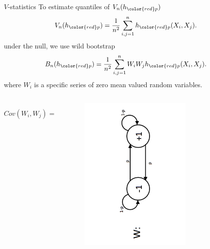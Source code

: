 \documentclass{beamer}
\begin{document}
 
  \begin{frame}{$V$-statistics}
To estimate quantiles of $ V_n(h_{\color{red} p})$  
\[
 V_n(h_{\color{red} p}) = \frac {1} {n^2} \sum_{i,j=1}^n h_{\color{red} p}(X_i,X_j).
\]
under the null, we use wild bootstrap
\[
 B_n(h_{\color{red} p}) = \frac {1} {n^2} \sum_{i,j=1}^n W_i W_j h_{\color{red} p}(X_i,X_j).
\]
  where $W_i$ is a specific series of zero mean valued random variables.
  
\begin{columns}
        \begin{column}{.5\textwidth}
         $$
  Cov(W_i,W_j) = (1-\frac{2}{\log n})^{-|i-j|}
  $$
        \end{column}
        \begin{column}{.5\textwidth}
            \begin{figure}
            \vspace{-0.5cm}
           \includegraphics[width=0.7\textwidth, angle =-90 ]{./img/W_graphicalModel.pdf} 
        \end{figure}
        \end{column}
    \end{columns}

  
  \end{frame}
\end{document}
